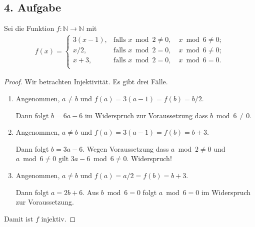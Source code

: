\documentclass[a5paper]{article}
\theoremstyle{remark}
\begin{document}
\subsection*{4. Aufgabe}
Sei die Funktion \(f\colon \mathbb{N} \to \mathbb{N}\) mit
\begin{align*}
  f(x) =
  \begin{cases}
    3(x - 1), & \text{falls } x \bmod 2 \ne 0, \quad x \bmod 6 \ne 0; \\
    x/2, & \text{falls } x \bmod 2 = 0,\quad x \bmod 6 \ne 0; \\
    x+3, & \text{falls } x \bmod 2 = 0, \quad x \bmod 6 = 0. \\
  \end{cases}
\end{align*}
\begin{proof}
  Wir betrachten Injektivität.  Es gibt drei Fälle.
  \begin{enumerate}
  \item Angenommen,  \(a \ne b\) und \(f(a) = 3(a-1) = f(b) = b/2\).

    Dann folgt \(b = 6a - 6\) im Widerspruch zur Voraussetzung dass \(b
    \bmod 6 \ne 0\).

  \item Angenommen,  \(a \ne b\) und \(f(a) = 3(a-1) = f(b) = b+3\).

    Dann folgt \(b = 3a - 6\).  Wegen Voraussetzung dass \(a \bmod 2 \ne 0\)
    und \(a \bmod 6 \ne 0\) gilt \(3a - 6 \bmod 6 \ne 0\).  Widerspruch!

  \item Angenommen,  \(a \ne b\) und \(f(a) = a/2 = f(b) = b+3\).

    Dann folgt \(a = 2b + 6\).  Aus \(b \bmod 6 = 0\) folgt \(a \bmod 6 = 0\)
    im Widerspruch zur Voraussetzung.
  \end{enumerate}
  Damit ist \(f\) injektiv.
\end{proof}
\end{document}
